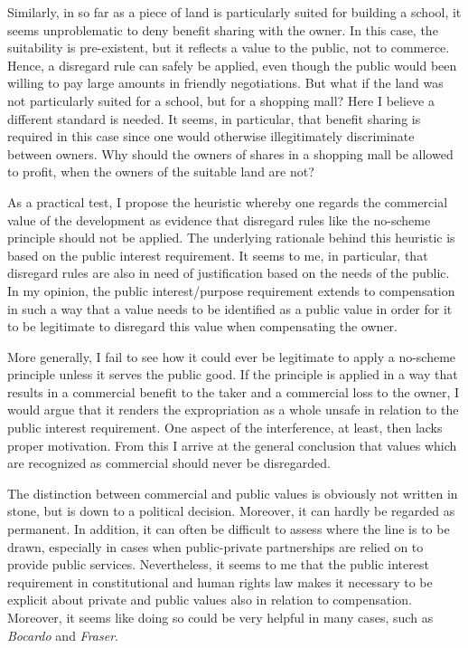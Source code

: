 Similarly, in so far as a piece of land is particularly suited for building a school, it seems unproblematic to deny benefit sharing with the owner. In this case, the suitability is pre-existent, but it reflects a value to the public, not to commerce. Hence, a disregard rule can safely be applied, even though the public would been willing to pay large amounts in friendly negotiations. But what if the land was not particularly suited for a school, but for a shopping mall? Here I believe a different standard is needed. It seems, in particular, that benefit sharing is required in this case since one would otherwise illegitimately discriminate between owners. Why should the owners of shares in a shopping mall be allowed to profit, when the owners of the suitable land are not?

As a practical test, I propose the heuristic whereby one regards the commercial value of the development as evidence that disregard rules like the no-scheme principle should not be applied. The underlying rationale behind this heuristic is based on the public interest requirement. It seems to me, in particular, that disregard rules are also in need of justification based on the needs of the public.
In my opinion, the public interest/purpose requirement extends to compensation in such a way that a value needs to be identified as a public value in order for it to be legitimate to disregard this value when compensating the owner. 

More generally, I fail to see how it could ever be legitimate to apply a no-scheme principle unless it serves the public good. If the principle is applied in a way that results in a commercial benefit to the taker and a commercial loss to the owner, I would argue that it renders the expropriation as a whole unsafe in relation to the public interest requirement. One aspect of the interference, at least, then lacks proper motivation. From this I arrive at the general conclusion that values which are recognized as commercial should never be disregarded.

The distinction between commercial and public values is obviously not written in stone, but is down to a political decision. Moreover, it can hardly be regarded as permanent. In addition, it can often be difficult to assess where the line is to be drawn, especially in cases when public-private partnerships are relied on to provide public services. Nevertheless, it seems to me that the public interest requirement in constitutional and human rights law makes it necessary to be explicit about private and public values also in relation to compensation. Moreover, it seems like doing so could be very helpful in many cases, such as {\it Bocardo} and {\it Fraser}.

